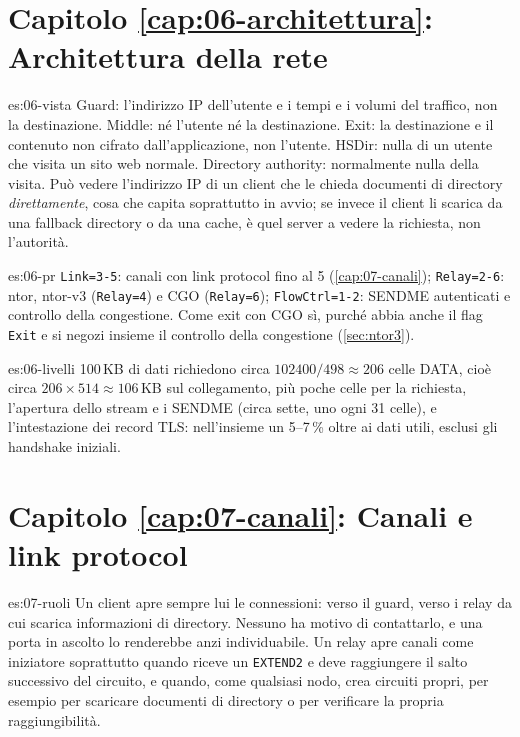 \section*{Capitolo \ref{cap:06-architettura}: Architettura della rete}

\begin{soluzione}{es:06-vista}
Guard: l'indirizzo IP dell'utente e i tempi e i volumi del traffico, non la destinazione. Middle: né l'utente né la destinazione. Exit: la destinazione e il contenuto non cifrato dall'applicazione, non l'utente. HSDir: nulla di un utente che visita un sito web normale. Directory authority: normalmente nulla della visita. Può vedere l'indirizzo IP di un client che le chieda documenti di directory \emph{direttamente}, cosa che capita soprattutto in avvio; se invece il client li scarica da una fallback directory o da una cache, è quel server a vedere la richiesta, non l'autorità.
\end{soluzione}

\begin{soluzione}{es:06-pr}
\texttt{Link=3-5}: canali con link protocol fino al 5 (\cref{cap:07-canali}); \texttt{Relay=2-6}: ntor, ntor-v3 (\texttt{Relay=4}) e CGO (\texttt{Relay=6}); \texttt{FlowCtrl=1-2}: SENDME autenticati e controllo della congestione. Come exit con CGO sì, purché abbia anche il flag \texttt{Exit} e si negozi insieme il controllo della congestione (\cref{sec:ntor3}).
\end{soluzione}

\begin{soluzione}{es:06-livelli}
100\,KB di dati richiedono circa $102400/498 \approx 206$ celle DATA, cioè circa $206 \times 514 \approx 106$\,KB sul collegamento, più poche celle per la richiesta, l'apertura dello stream e i SENDME (circa sette, uno ogni 31 celle), e l'intestazione dei record TLS: nell'insieme un 5--7\,\% oltre ai dati utili, esclusi gli handshake iniziali.
\end{soluzione}

\section*{Capitolo \ref{cap:07-canali}: Canali e link protocol}

\begin{soluzione}{es:07-ruoli}
Un client apre sempre lui le connessioni: verso il guard, verso i relay da cui scarica informazioni di directory. Nessuno ha motivo di contattarlo, e una porta in ascolto lo renderebbe anzi individuabile. Un relay apre canali come iniziatore soprattutto quando riceve un \texttt{EXTEND2} e deve raggiungere il salto successivo del circuito, e quando, come qualsiasi nodo, crea circuiti propri, per esempio per scaricare documenti di directory o per verificare la propria raggiungibilità.
\end{soluzione}


